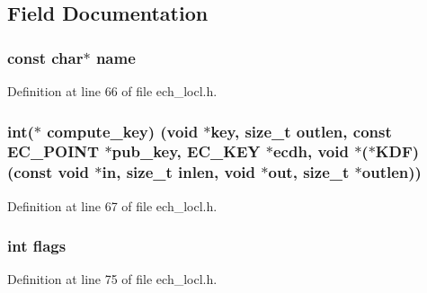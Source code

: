 \subsection{Field Documentation}
\subsubsection[{\texorpdfstring{name}{name}}]{\setlength{\rightskip}{0pt plus 5cm}const char$\ast$ name}\hypertarget{structecdh__method_a8f8f80d37794cde9472343e4487ba3eb}{}\label{structecdh__method_a8f8f80d37794cde9472343e4487ba3eb}


Definition at line 66 of file ech\+\_\+locl.\+h.

\subsubsection[{\texorpdfstring{compute\+\_\+key}{compute_key}}]{\setlength{\rightskip}{0pt plus 5cm}int($\ast$ compute\+\_\+key) ({\bf void} $\ast$key, size\+\_\+t outlen, const {\bf E\+C\+\_\+\+P\+O\+I\+NT} $\ast$pub\+\_\+key, {\bf E\+C\+\_\+\+K\+EY} $\ast$ecdh, {\bf void} $\ast$($\ast$K\+DF)(const {\bf void} $\ast$in,                                                                                                     size\+\_\+t inlen, {\bf void} $\ast$out,                                                                                                     size\+\_\+t $\ast$outlen))}\hypertarget{structecdh__method_af9b1fdf248d51d0c8d3dcf340430e4f0}{}\label{structecdh__method_af9b1fdf248d51d0c8d3dcf340430e4f0}


Definition at line 67 of file ech\+\_\+locl.\+h.

\subsubsection[{\texorpdfstring{flags}{flags}}]{\setlength{\rightskip}{0pt plus 5cm}int flags}\hypertarget{structecdh__method_ac8bf36fe0577cba66bccda3a6f7e80a4}{}\label{structecdh__method_ac8bf36fe0577cba66bccda3a6f7e80a4}


Definition at line 75 of file ech\+\_\+locl.\+h.

